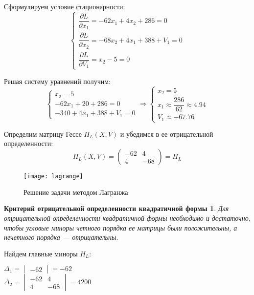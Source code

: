 Сформулируем условие стационарности:
\begin{equation*}
\begin{cases}
	\dfrac{\partial L}{\partial x_1} = -62 x_1 + 4 x_2 + 286 = 0 \\[0.3cm]
	\dfrac{\partial L}{\partial x_2} = -68 x_2 + 4 x_1 + 388 + V_1 = 0 \\[0.3cm]
	\dfrac{\partial L}{\partial V_1} = x_2 - 5 = 0
\end{cases}
\end{equation*}

Решая систему уравнений получим:
\begin{equation*}
\begin{cases}
	x_2 = 5 \\
	-62 x_1 + 20 + 286 = 0 \\
	-340 + 4 x_1 + 388 + V_1 = 0
\end{cases}
\Rightarrow
\begin{cases}
	x_2 = 5 \\
	x_1 \approx \dfrac{286}{62} \approx 4.94 \\
	V_1 \approx -67.76
\end{cases}
\end{equation*}

Определим матрицу Гессе $H_L(X, V)$ и убедимся в ее отрицательной определенности:
\begin{equation*}
H_L(X, V) =
\begin{pmatrix}
	-62 & 4 \\
	4 & -68
\end{pmatrix} = H_L 
\end{equation*}

\begin{wrapfigure}[11]{r}{0.45\textwidth}
\begin{center}
	\texttt{[image: lagrange]}
	\caption{Решение задачи методом Лагранжа}
	\label{fig:lagrange}
\end{center}
\end{wrapfigure}

\newtheorem*{theorem1}{Критерий отрицательной определенности квадратичной формы}
\begin{theorem1}
Для отрицательной определенности квадратичной формы необходимо и достаточно, чтобы угловые миноры четного порядка ее матрицы были положительны, а нечетного порядка — отрицательны.
\end{theorem1}

Найдем главные миноры $H_L$:
\begin{center}
$\Delta_1 = \begin{vmatrix} -62 \end{vmatrix} = -62$\\
$\Delta_2 = \begin{vmatrix}
	-62 & 4 \\
	4 & -68
\end{vmatrix} = 4200$
\end{center}

